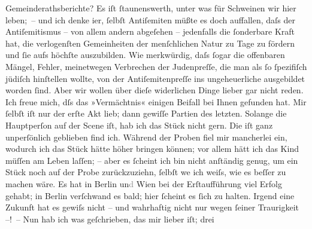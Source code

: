 \begin{ledgroupsized}[t]{13cm}
               Gemeinderathsberichte? Es iſt ſtaunenswerth, unter was für Schweinen wir hier
               leben; – und {\pb}ich denke i{\geminationm}er, ſelbſt Antiſemiten müßte es doch auffallen, daſs
               der Antiſemitismus – von allem andern abgeſehen – jedenfalls die ſonderbare Kraft
               hat, die verlogenſten Gemeinheiten der menſchlichen Natur zu Tage zu fördern und ſie
               aufs höchſte auszubilden. Wie merkwürdig, daſs ſogar die offenbaren Mängel, Fehler,
               meinetwegen Verbrechen der Judenpreſſe, die man als ſo ſpezifiſch jüdiſch hinſtellen
               wollte, von der Antiſemiten{\pb}preſſe ins
               ungeheuerliche ausgebildet worden ſind. Aber wir wollen über dieſe widerlichen Dinge
               lieber gar nicht reden.\pend
           \pstart
           Ich freue mich, dſs das »Vermächtnis« einigen
               Beifall bei Ihnen gefunden hat. Mir ſelbſt iſt nur der erſte Akt lieb; dann gewiſſe
               Partien des letzten. Solange die Hauptperſon auf der Scene iſt, hab ich das Stück
               nicht gern. Die iſt ganz unperſönlich geblieben find ich. Während der Proben fiel mir
               mancherlei ein, wodurch ich das Stück hätte höher bringen können; vor allem hätt ich
               das Kind {\pb}müſſen am Leben laſſen; – aber es
               ſcheint ich bin nicht anſtändig genug, um ein Stück noch auf der Probe zurückzuziehn,
               ſelbſt we{\geminationn} ich weiſs, wie es beſſer zu machen wäre. Es
               hat in Berlin un\textcolor{gray}{d}{ }Wien bei der Erſtaufführung viel Erfolg gehabt; in
                  Berlin verſchwand es bald; hier ſcheint es
               ſich zu halten. Irgend eine Zukunft hat es gewiſs nicht – und wahrhaftig nicht nur
               wegen ſeiner Traurigkeit –! – Nun hab ich was geſchrieben, das mir lieber iſt; drei

\end{ledgroupsized}
